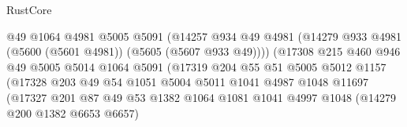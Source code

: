 \begin{lexlean}{RustCore}
\begin{coremodule}
                                      @49
                                      @1064
                                      @4981
                                      @5005
                                      @5091
                                      (@14257
                                        @934
                                        @49
                                        @4981
                                        (@14279
                                          @933
                                          @4981
                                          (@5600 (@5601 @4981))
                                          (@5605 (@5607 @933 @49))))
                                      (@17308
                                        @215
                                        @460
                                        @946
                                        @49
                                        @5005
                                        @5014
                                        @1064
                                        @5091
                                        (@17319
                                          @204
                                          @55
                                          @51
                                          @5005
                                          @5012
                                          @1157
                                          (@17328
                                            @203
                                            @49
                                            @54
                                            @1051
                                            @5004
                                            @5011
                                            @1041
                                            @4987
                                            @1048
                                            @11697
                                            (@17327
                                              @201
                                              @87
                                              @49
                                              @53
                                              @1382
                                              @1064
                                              @1081
                                              @1041
                                              @4997
                                              @1048
                                              (@14279 @200 @1382 @6653 @6657)

\end{coremodule}
\end{lexlean}
